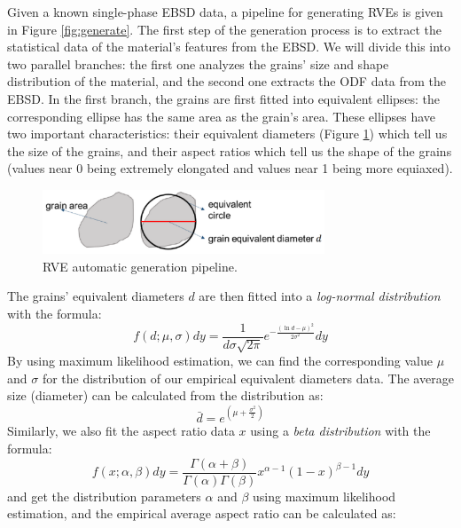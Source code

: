 Given a known single-phase EBSD data, a pipeline for generating RVEs is given in Figure \ref{fig:generate}. The first step of the generation process is to extract the statistical data of the material's features from the EBSD. We will divide this into two parallel branches: the first one analyzes the grains' size and shape distribution of the material, and the second one extracts the ODF data from the EBSD. In the first branch, the grains are first fitted into equivalent ellipses: the corresponding ellipse has the same area as the grain's area. These ellipses have two important characteristics: their equivalent diameters (Figure \ref{fig:grainfit}) which tell us the size of the grains, and their aspect ratios which tell us the shape of the grains (values near 0 being extremely elongated and values near 1 being more equiaxed). 
\begin{figure}[h!]
    \captionsetup{justification=centering,margin=1cm}
    \centering
    \includegraphics[width=0.75\textwidth]{Image/grainfit.png}
    \caption{RVE automatic generation pipeline.}
    \label{fig:grainfit}
\end{figure}
The grains' equivalent diameters $d$ are then fitted into a \textit{log-normal distribution} with the formula:
\begin{equation}
f(d; \mu, \sigma)dy = \frac{1}{d\sigma \sqrt{2\pi}}e^{-\frac{(\ln d - \mu)^2}{2\sigma^2}}dy
\end{equation}
By using maximum likelihood estimation, we can find the corresponding value $\mu$ and $\sigma$ for the distribution of our empirical equivalent diameters data. The average size (diameter) can be calculated from the distribution as:
\begin{equation}
\bar{d} = e^{\left(\mu+\frac{\sigma^2}{2}\right)}
\end{equation}
Similarly, we also fit the aspect ratio data $x$ using a \textit{beta distribution} with the formula:
\begin{equation}
f(x; \alpha, \beta)dy = \frac{\Gamma(\alpha + \beta)}{\Gamma(\alpha)\Gamma(\beta)}x^{\alpha - 1}(1 - x)^{\beta - 1}dy
\end{equation}
and get the distribution parameters $\alpha$ and $\beta$ using maximum likelihood estimation, and the empirical average aspect ratio can be calculated as:
